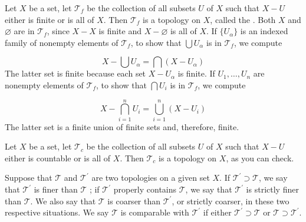 \begin{centeredblock*}
 \begin{example}
\label{ex:\thesection.\theexample}
  Let \(X\) be a set, let \(\mathcal{T}_{f}\) be the collection of all subsets \(U\) of \(X\) such that \(X - U\) either is finite or is all of \(X\). Then \(\mathcal{T}_{f}\) is a topology on \(X\), called the . Both \(X\) and \(\varnothing\) are in \(\mathcal{T}_{f}\), since \(X - X\) is finite and \(X - \varnothing\) is all of \(X\). If \(\{ U_{\alpha }\}\) is an indexed family of nonempty elements of \(\mathcal{T}_{f}\), to show that \(\bigcup {U}_{\alpha }\) is in \(\mathcal{T}_{f}\), we compute

  \[
  X - \bigcup {U}_{\alpha } = \bigcap ( {X - U_{\alpha }})
  \]
  The latter set is finite because each set \(X - U_{\alpha }\) is finite. If \(U_{1},\ldots ,U_{n}\) are nonempty elements of \(\mathcal{T}_{f}\), to show that \(\bigcap {U}_{i}\) is in \(\mathcal{T}_{f}\), we compute

  \[
  X - \mathop{\bigcap }\limits_{{i = 1}}^{n}U_{i} = \mathop{\bigcup }\limits_{{i = 1}}^{n}( {X - U_{i}})
  \]
  The latter set is a finite union of finite sets and, therefore, finite.
 \end{example}
\end{centeredblock*}

\begin{centeredblock}
 \begin{example}
\label{ex:\thesection.\theexample}
  Let \(X\) be a set, let \(\mathcal{T}_{c}\) be the collection of all subsets \(U\) of \(X\) such that \(X - U\) either is countable or is all of \(X\). Then \(\mathcal{T}_{c}\) is a topology on \(X\), as you can check.
 \end{example}
\end{centeredblock}

\begin{definition}
 Suppose that \(\mathcal{T}\) and \(\mathcal{T}^{\prime }\) are two topologies on a given set \(X\). If \(\mathcal{T}^{\prime } \supset \mathcal{T}\), we say that \(\mathcal{T}^{\prime }\) is finer than \(\mathcal{T}\) ; if \(\mathcal{T}^{\prime }\) properly contains \(\mathcal{T}\), we say that \(\mathcal{T}^{\prime }\) is strictly finer than \(\mathcal{T}\). We also say that \(\mathcal{T}\) is coarser than \(\mathcal{T}^{\prime }\), or strictly coarser, in these two respective situations. We say \(\mathcal{T}\) is comparable with \(\mathcal{T}^{\prime }\) if either \(\mathcal{T}^{\prime } \supset \mathcal{T}\) or \(\mathcal{T} \supset {\mathcal{T}}^{\prime }\).
\end{definition}


